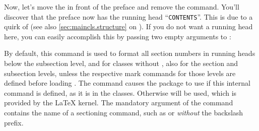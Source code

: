 \begin{Example}
      Now, let's move the  in front
      of the preface and remove the  command. You'll
      discover that the preface now has the running head
      ``\texttt{CONTENTS}''. This is due to a quirk of
       (see also \autoref{sec:maincls.structure}
      on ). If you do not want a running
      head here, you can easily accomplish this by passing two empty arguments 
      to :
    \end{Example}
  \fi%
  \EndIndexGroup
\fi


  \begin{Declaration}
  \end{Declaration}
  By default, this command is used to format all section numbers in running 
  heads below the subsection level, and for classes without
  , also for the section and subsection levels,
  unless the respective mark commands for those levels are defined before
  loading . The command causes the package to use
   if this internal command is defined,
  as it is in the \KOMAScript{} classes. Otherwise %
   will be used,
  which is provided by the \LaTeX{} kernel. The mandatory argument of the
  command contains the name of a sectioning command, such as 
  or  \emph{without} the backslash prefix.

